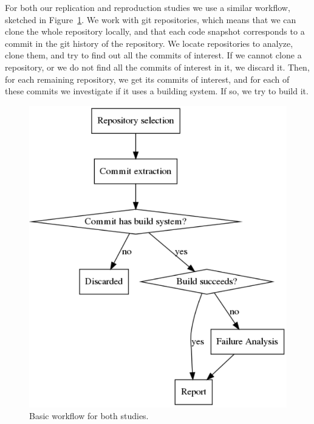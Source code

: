 For both our replication and reproduction studies we use a similar workflow, sketched in Figure~\ref{fig:methodology}. We work with git repositories, which means that we can clone the whole repository locally, and that each code snapshot corresponds to a commit in the git history of the repository. We locate repositories to analyze, clone them, and try to find out all the commits of interest. If we cannot clone a repository, or we do not find all the commits of interest in it, we discard it. Then, for each remaining repository, we get its commits of interest, and for each of these commits we investigate if it uses a building system. If so, we try to build it.

\begin{figure}[ht!]
\centering    
\includegraphics[height=\textwidth]{pages/01-Buildability/images/Methodology.pdf}
\caption{Basic workflow for both studies.}
\label{fig:methodology}
\end{figure}


\renewcommand{\tabcolsep}{3pt}

